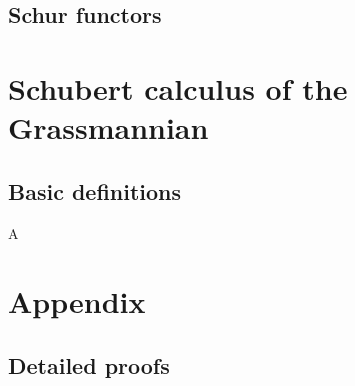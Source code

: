 \documentclass{article}
\begin{document}
\subsection{Schur functors}

\section{Schubert calculus of the Grassmannian}

\subsection{Basic definitions}

\begin{definition}
    A 
\end{definition}

\section{Appendix}

\subsection{Detailed proofs}
\end{document}
